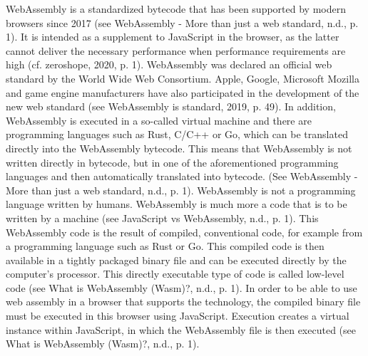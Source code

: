 WebAssembly is a standardized bytecode that has been supported by modern browsers since 2017 (see WebAssembly - More than just a web standard, n.d., p. 1). It is intended as a supplement to JavaScript in the browser, as the latter cannot deliver the necessary performance when performance requirements are high (cf. zeroshope, 2020, p. 1).
WebAssembly was declared an official web standard by the World Wide Web Consortium. Apple, Google, Microsoft Mozilla and game engine manufacturers have also participated in the development of the new web standard (see \dq WebAssembly is standard\dq, 2019, p. 49).
In addition, WebAssembly is executed in a so-called virtual machine and there are programming languages such as Rust, C/C++ or Go, which can be translated directly into the WebAssembly bytecode. This means that WebAssembly is not written directly in bytecode, but in one of the aforementioned programming languages and then automatically translated into bytecode. (See WebAssembly - More than just a web standard, n.d., p. 1).
WebAssembly is not a programming language written by humans. WebAssembly is much more a code that is to be written by a machine (see JavaScript vs WebAssembly, n.d., p. 1). This WebAssembly code is the result of compiled, conventional code, for example from a programming language such as Rust or Go. This compiled code is then available in a tightly packaged binary file and can be executed directly by the computer's processor. This directly executable type of code is called low-level code (see What is WebAssembly (Wasm)?, n.d., p. 1).
In order to be able to use web assembly in a browser that supports the technology, the compiled binary file must be executed in this browser using JavaScript. Execution creates a virtual instance within JavaScript, in which the WebAssembly file is then executed (see What is WebAssembly (Wasm)?, n.d., p. 1).
